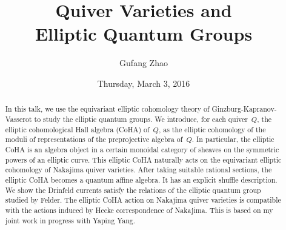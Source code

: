 \documentclass{UAmathtalk}
\author{Gufang Zhao}
\title{Quiver Varieties and\\ Elliptic Quantum Groups}
\date{Thursday, March 3, 2016}
\begin{document}
\maketitle

\begin{abstract}
In this talk, we use the equivariant elliptic cohomology theory of Ginzburg-Kapranov-Vasserot to study the elliptic quantum groups.  We introduce, for each quiver~$Q$, the elliptic cohomological Hall algebra (CoHA) of~$Q$, as the elliptic cohomology of the moduli of representations of the preprojective algebra of~$Q$. In particular, the elliptic CoHA is an algebra object in a certain monoidal category of sheaves on the symmetric powers of an elliptic curve.  This elliptic CoHA naturally acts on the equivariant elliptic cohomology of Nakajima quiver varieties. After taking suitable rational sections, the elliptic CoHA becomes a quantum affine algebra. It has an explicit shuffle description. We show the Drinfeld currents satisfy the relations of the elliptic quantum group studied by Felder. The elliptic CoHA action on Nakajima quiver varieties is compatible with the actions induced by Hecke correspondence of Nakajima. This is based on my joint work in progress with Yaping Yang.
\end{abstract}
\end{document}
